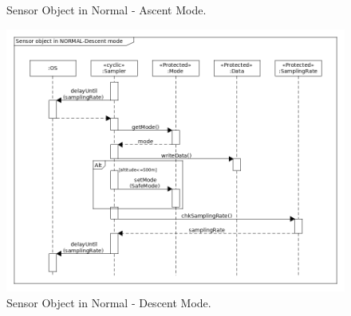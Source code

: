 \begin{landscape}
\begin{figure}[H]
    \caption{Sensor Object in Normal - Ascent Mode.}
    \label{sensorb}
\end{figure}
\begin{figure}[H]
    \centering
    \includegraphics[height=0.9\textwidth]{appendix/img/sensor-dia-seq-c.png}
    \caption{Sensor Object in Normal - Descent Mode.}
    \label{sensorc}
\end{figure}
\end{landscape}